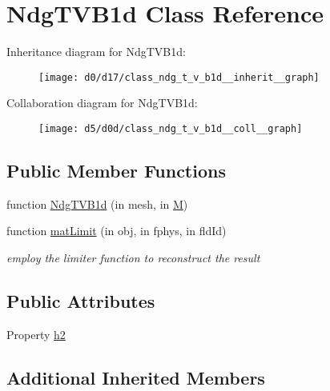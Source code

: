 \hypertarget{class_ndg_t_v_b1d}{}\section{Ndg\+T\+V\+B1d Class Reference}
\label{class_ndg_t_v_b1d}


Inheritance diagram for Ndg\+T\+V\+B1d\+:
\nopagebreak
\begin{figure}[H]
\begin{center}
\leavevmode
\texttt{[image: d0/d17/class\_ndg\_t\_v\_b1d\_\_inherit\_\_graph]}
\end{center}
\end{figure}


Collaboration diagram for Ndg\+T\+V\+B1d\+:
\nopagebreak
\begin{figure}[H]
\begin{center}
\leavevmode
\texttt{[image: d5/d0d/class\_ndg\_t\_v\_b1d\_\_coll\_\_graph]}
\end{center}
\end{figure}
\subsection*{Public Member Functions}
\begin{DoxyCompactItemize}
\item 
function \hyperlink{class_ndg_t_v_b1d_a9608667587b7714ec9400f38f37f7aff}{Ndg\+T\+V\+B1d} (in mesh, in \hyperlink{class_ndg_t_v_b_abstract_abaf02fa904da94fd6c6b4ca3fb65010c}{M})
\item 
function \hyperlink{class_ndg_t_v_b1d_a40ad2156347517a9258c709d25073180}{mat\+Limit} (in obj, in fphys, in fld\+Id)
\begin{DoxyCompactList}\small\item\em employ the limiter function to reconstruct the result \end{DoxyCompactList}\end{DoxyCompactItemize}
\subsection*{Public Attributes}
\begin{DoxyCompactItemize}
\item 
Property \hyperlink{class_ndg_t_v_b1d_a86f4d0b07304796a18fbb5861f4f7227}{h2}
\end{DoxyCompactItemize}
\subsection*{Additional Inherited Members}


